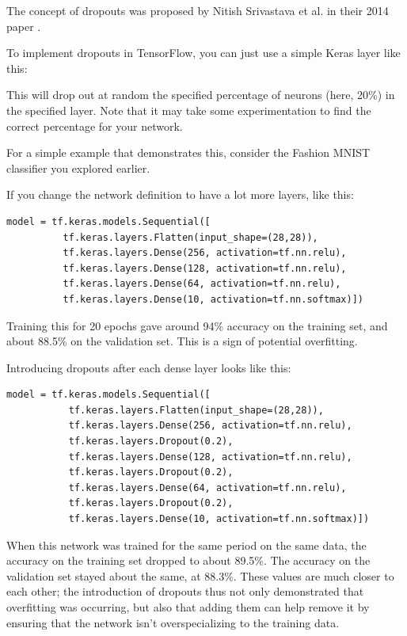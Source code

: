 The concept of dropouts was proposed by Nitish Srivastava et al. in their 2014 paper .

To implement dropouts in TensorFlow, you can just use a simple Keras layer like this:


This will drop out at random the specified percentage of neurons (here, 20\%) in the specified layer. Note that it may take some experimentation to find the correct percentage for your network.

For a simple example that demonstrates this, consider the Fashion MNIST classifier you explored earlier.

If you change the network definition to have a lot more layers, like this:

\begin{lstlisting}
model = tf.keras.models.Sequential([
          tf.keras.layers.Flatten(input_shape=(28,28)),
          tf.keras.layers.Dense(256, activation=tf.nn.relu),
          tf.keras.layers.Dense(128, activation=tf.nn.relu),
          tf.keras.layers.Dense(64, activation=tf.nn.relu),
          tf.keras.layers.Dense(10, activation=tf.nn.softmax)])
\end{lstlisting}

Training this for 20 epochs gave around 94\% accuracy on the training set, and about 88.5\% on the validation set. This is a sign of potential overfitting.

Introducing dropouts after each dense layer looks like this:

\begin{lstlisting}
model = tf.keras.models.Sequential([
           tf.keras.layers.Flatten(input_shape=(28,28)),
           tf.keras.layers.Dense(256, activation=tf.nn.relu),
           tf.keras.layers.Dropout(0.2),
           tf.keras.layers.Dense(128, activation=tf.nn.relu),
           tf.keras.layers.Dropout(0.2),
           tf.keras.layers.Dense(64, activation=tf.nn.relu),
           tf.keras.layers.Dropout(0.2),
           tf.keras.layers.Dense(10, activation=tf.nn.softmax)])
\end{lstlisting}

When this network was trained for the same period on the same data, the accuracy on the training set dropped to about 89.5\%. The accuracy on the validation set stayed about the same, at 88.3\%. These values are much closer to each other; the introduction of dropouts thus not only demonstrated that overfitting was occurring, but also that adding them can help remove it by ensuring that the network isn’t overspecializing to the training data.

